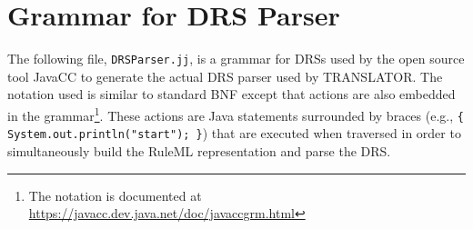 \documentclass[12pt]{report}
\begin{document}


\chapter{Grammar for DRS Parser}

The following file, \verb|DRSParser.jj|, is a grammar for DRSs used by the open source tool JavaCC to generate the actual DRS parser used by TRANSLATOR. The notation used is similar to standard BNF except that actions are also embedded in the grammar\footnote{The notation is documented at \url{https://javacc.dev.java.net/doc/javaccgrm.html}}. These actions are Java statements surrounded by braces (e.g., \verb|{ System.out.println("start"); }|) that are executed when traversed in order to simultaneously build the RuleML representation and parse the DRS.
\end{document}
